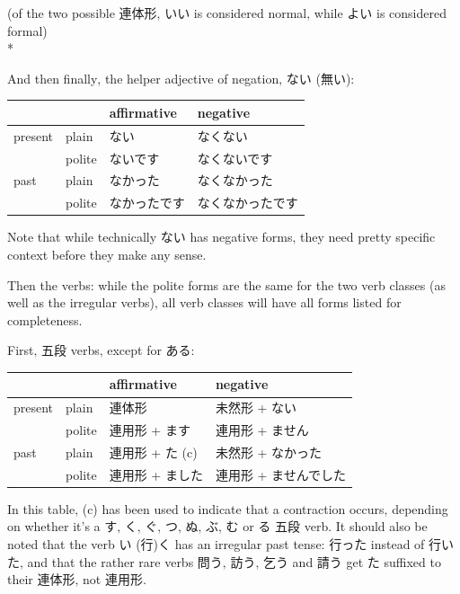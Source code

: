 \documentclass[11pt, b5paper, twoside, openright, onecolumn]{book}
\makeatletter
\newcommand*{\rubystack}[2]{{\relscale{0.5}%
  \begin{tabular}[b]{@{}c@{}}%
    {#1}\\%
   {\textscale{2}{#2}}%
  \end{tabular}}%
}
\DeclareRobustCommand*{\ruby}[2]{%
  \mbox{%
    \setlength{\parskip}{0ex}%
    \BeginAccSupp{method=pdfstringdef,ActualText={#1}}%
      \rubystack{\phantom{#2}}{#1}%
      \llap{%
        \rubystack{#2}{\phantom{#1}}%
      }%
    \EndAccSupp{}%
  }%
}
\renewcommand*{\ruby}[2]{#2 (#1)}%
\newenvironment{exampleblock}{
\setlength{\parindent}{0.6in}
\begin{minipage}[t]{\dimexpr\textwidth-\parindent}}
{\end{minipage}}
\newenvironment{mytabular}[1]{\noindent\hspace{0.4in}
\begin{tabular}[h]{#1}}{\end{tabular}}
\makeatother
\begin{document}
\begin{exampleblock}
(of the two possible 連体形‚ いい is considered normal‚ while よい is considered formal) \\* 
\end{exampleblock}
\vspace{0.2cm}

And then finally‚ the helper adjective of negation‚ ない (無い):

\vspace{0.5cm}
\smaller
\begin{mytabular}{| l  l  l  l |}\hline 
\rule{0pt}{2.4ex} &  & affirmative & negative\\ 
\hline
\rule{0pt}{2.4ex}present & plain & ない & なくない\\ 
\rule{0pt}{2.4ex} & polite & ないです & なくないです\\ 
\rule{0pt}{2.4ex}past & plain & なかった & なくなかった\\ 
\rule{0pt}{2.4ex} & polite & なかったです & なくなかったです\\ 
\hline 
\end{mytabular}
\larger
\vspace{0.5cm}


Note that while technically ない has negative forms‚ they need pretty specific context before they make any sense.

Then the verbs: while the polite forms are the same for the two verb classes (as well as the irregular verbs)‚ all verb classes will have all forms listed for completeness.

First‚ 五段 verbs‚ except for ある:

\vspace{0.5cm}
\smaller
\begin{mytabular}{| l  l  l  l |}\hline 
\rule{0pt}{2.4ex} &  & affirmative & negative\\ 
\hline
\rule{0pt}{2.4ex}present & plain & 連体形 & 未然形 + ない\\ 
\rule{0pt}{2.4ex} & polite & 連用形 + ます & 連用形 + ません\\ 
\rule{0pt}{2.4ex}past & plain & 連用形 + た (c) & 未然形 + なかった\\ 
\rule{0pt}{2.4ex} & polite & 連用形 + ました & 連用形 + ませんでした\\ 
\hline 
\end{mytabular}
\larger
\vspace{0.5cm}


In this table‚ (c) has been used to indicate that a contraction occurs‚ depending on whether it’s a す‚ く‚ ぐ‚ つ‚ ぬ‚ ぶ‚ む or る 五段 verb. It should also be noted that the verb \ruby{行}{い}く has an irregular past tense: 行った instead of 行いた‚ and that the rather rare verbs 問う‚ 訪う‚ 乞う and 請う get た suffixed to their 連体形‚ not 連用形.
\end{document}
